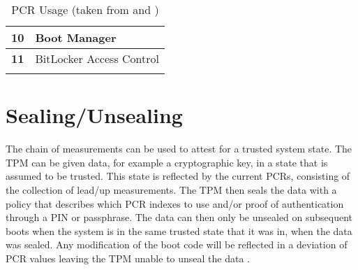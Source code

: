 \begin{table}[htb]
\begin{tabularx}{1.0\textwidth}{cX}
        \midrule
        \textbf{10}                 & Boot Manager                                                                                             \\[\defaultaddspace]
        \midrule
        \textbf{11}                 & BitLocker Access Control                                                                                 \\
        \arrayrulecolor{black}
        \bottomrule
    \end{tabularx}%
    \caption[\acs{PCR} Usage]{\ac{PCR} Usage (taken from \cite[Table 1]{tcg-pc-client-platform-firmware-profile-spec} and \cite[Table 9-2]{windows-internals-6-part2})}%
    \label{tab:pcr-usage}%
\end{table}


\section{Sealing/Unsealing}

The chain of measurements can be used to attest for a trusted system state.
The \ac{TPM} can be given data, for example a cryptographic key, in a state that is assumed to be trusted.
This state is reflected by the current \acp{PCR}, consisting of the collection of lead\-/up measurements.
The \ac{TPM} then seals the data with a policy that describes which \ac{PCR} indexes to use and/or proof of authentication through a \ac{PIN} or passphrase.
The data can then only be unsealed on subsequent boots when the system is in the same trusted state that it was in, when the data was sealed.
Any modification of the boot code will be reflected in a deviation of \ac{PCR} values leaving the \ac{TPM} unable to unseal the data \cite[Section 3.3.6]{trusted-computing-platforms}.